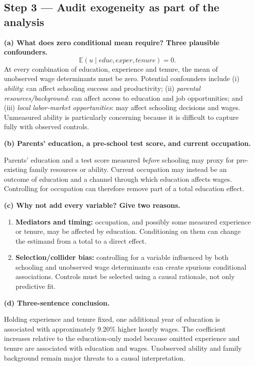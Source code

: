 \documentclass[11pt,a4paper]{article}
\newcommand{\E}{\mathbb{E}}
\begin{document}
\subsection{Step 3 --- Audit exogeneity as part of the analysis}
\textbf{(a) What does zero conditional mean require? Three plausible confounders.}
\[
\boxed{\E(u\mid educ,exper,tenure)=0.}
\]
At every combination of education, experience and tenure, the mean of unobserved wage determinants must be zero. Potential confounders include (i) \emph{ability}: can affect schooling success and productivity; (ii) \emph{parental resources/background}: can affect access to education and job opportunities; and (iii) \emph{local labor-market opportunities}: may affect schooling decisions and wages. Unmeasured ability is particularly concerning because it is difficult to capture fully with observed controls.

\textbf{(b) Parents' education, a pre-school test score, and current occupation.}

Parents' education and a test score measured \emph{before} schooling may proxy for pre-existing family resources or ability. Current occupation may instead be an outcome of education and a channel through which education affects wages. Controlling for occupation can therefore remove part of a total education effect.

\textbf{(c) Why not add every variable? Give two reasons.}
\begin{enumerate}[label=\arabic*.]
\item \textbf{Mediators and timing:} occupation, and possibly some measured experience or tenure, may be affected by education. Conditioning on them can change the estimand from a total to a direct effect.
\item \textbf{Selection/collider bias:} controlling for a variable influenced by both schooling and unobserved wage determinants can create spurious conditional associations. Controls must be selected using a causal rationale, not only predictive fit.
\end{enumerate}
\textbf{(d) Three-sentence conclusion.}

Holding experience and tenure fixed, one additional year of education is associated with approximately 9.20\% higher hourly wages. The coefficient increases relative to the education-only model because omitted experience and tenure are associated with education and wages. Unobserved ability and family background remain major threats to a causal interpretation.
\end{document}
